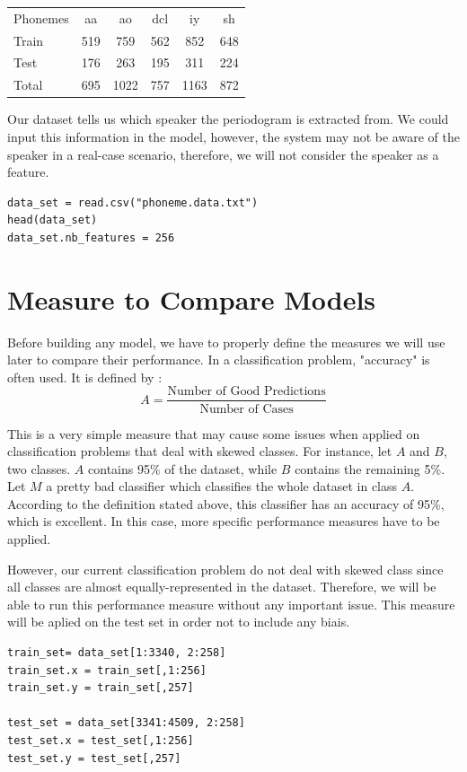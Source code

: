 \documentclass[]{report}
\begin{document}
\begin{center}
\begin{tabular}{l c c c c c}
 Phonemes	 & aa &  ao & dcl & iy & sh \\
Train & 519 & 759 & 562 & 852 & 648\\
Test  & 176 & 263 & 195 & 311 & 224\\
Total & 695 & 1022 & 757 & 1163 & 872
\end{tabular}
\end{center}

Our dataset tells us which speaker the periodogram is extracted from. We could input this information in the model, however, the system may not be aware of the speaker in a real-case scenario, therefore, we will not consider the speaker as a feature. 

\begin{lstlisting}
data_set = read.csv("phoneme.data.txt")
head(data_set)
data_set.nb_features = 256
\end{lstlisting}

\section{Measure to Compare Models}
Before building any model, we have to properly define the measures we will use later to compare their performance. In a classification problem, "accuracy" is often used. It is defined by :
$$
	A = \frac{\text{Number of Good Predictions}}{\text{Number of Cases}}
$$

This is a very simple measure that may cause some issues when applied on classification problems that deal with skewed classes. For instance, let $A$ and $B$, two classes. $A$ contains 95\% of the dataset, while $B$ contains the remaining 5\%. Let $M$ a pretty bad classifier which classifies the whole dataset in class $A$. According to the definition stated above, this classifier has an accuracy of 95\%, which is excellent. In this case, more specific performance measures have to be applied.

However, our current classification problem do not deal with skewed class since all classes are almost equally-represented in the dataset. Therefore, we will be able to run this performance measure without any important issue. This measure will be aplied on the test set in order not to include any biais.

\begin{lstlisting}
train_set= data_set[1:3340, 2:258]
train_set.x = train_set[,1:256]
train_set.y = train_set[,257]

test_set = data_set[3341:4509, 2:258]
test_set.x = test_set[,1:256]
test_set.y = test_set[,257]
\end{lstlisting}
\end{document}
